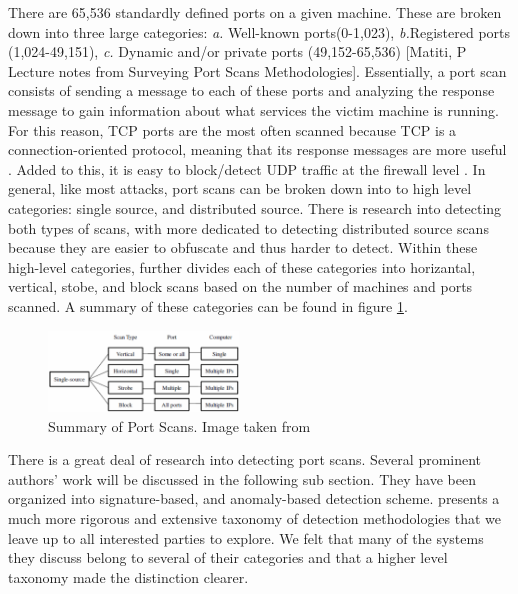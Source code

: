 \documentclass{acm_proc_article-sp}
\begin{document}
	 There are 65,536 standardly defined ports on a given machine. These are broken down into three large categories: \emph{a.} Well-known ports(0-1,023), \emph{b.}Registered ports (1,024-49,151), \emph{c.} Dynamic and/or private ports (49,152-65,536) [Matiti, P Lecture notes from Surveying Port Scans Methodologies]. %
Essentially, a port scan consists of sending a message to each of these ports and analyzing the response message to gain information about what services the victim machine is running. For this reason, TCP ports are the most often scanned because TCP is a connection-oriented protocol, meaning that its response messages are more useful \cite{SilenokElena;RoedelChris;Silenok}. Added to this, it is easy to block/detect UDP traffic at the firewall level \cite{Bhuyan2011}. In general, like most attacks, port scans can be broken down into to high level categories: single source, and distributed source. There is research into detecting both types of scans, with more dedicated to detecting distributed source scans because they are easier to obfuscate and thus harder to detect. Within these high-level categories, \cite{Staniford2002} further divides each of these categories into horizantal, vertical, stobe, and block scans based on the number of machines and ports scanned. A summary of these categories can be found in figure \ref{portScans}.
	\begin{figure}[h!]
		\centering
		\includegraphics[width=0.45\textwidth]{portScans.png}
		\caption{Summary of Port Scans. Image taken from \cite{Bhuyan2011}}
		\label{portScans}
	\end{figure}
	
	There is a great deal of research into detecting port scans. Several prominent authors' work will be discussed in the following sub section. They have been organized into signature-based, and anomaly-based detection scheme. \cite{Bhuyan2011} presents a much more rigorous and extensive taxonomy of detection methodologies that we leave up to all interested parties to explore. We felt that many of the systems they discuss belong to several of their categories and that a higher level taxonomy made the distinction clearer. 
\end{document}
